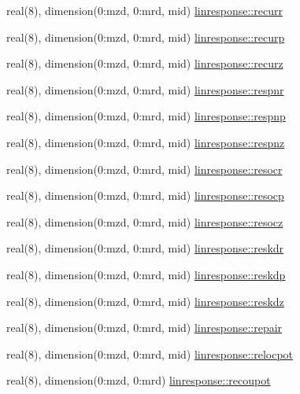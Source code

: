 \begin{DoxyCompactItemize}
\item 
real(8), dimension(0\+:mzd, 0\+:mrd, mid) \hyperlink{namespacelinresponse_a222c8a4189b33f0a3d3e5ecb65f9eb71}{linresponse\+::recurr}
\item 
real(8), dimension(0\+:mzd, 0\+:mrd, mid) \hyperlink{namespacelinresponse_ad8ba23f685d178f2b77689ff9ebcc4fd}{linresponse\+::recurp}
\item 
real(8), dimension(0\+:mzd, 0\+:mrd, mid) \hyperlink{namespacelinresponse_a8fa0a4d1352ead394965075f9ce9d71b}{linresponse\+::recurz}
\item 
real(8), dimension(0\+:mzd, 0\+:mrd, mid) \hyperlink{namespacelinresponse_a1bf3f31e13280679b10213f2bbf20a6d}{linresponse\+::respnr}
\item 
real(8), dimension(0\+:mzd, 0\+:mrd, mid) \hyperlink{namespacelinresponse_ac5eaeb720dd5f4c714f729f5c743a803}{linresponse\+::respnp}
\item 
real(8), dimension(0\+:mzd, 0\+:mrd, mid) \hyperlink{namespacelinresponse_a5521f9f4746cad113563a738f4ca93a5}{linresponse\+::respnz}
\item 
real(8), dimension(0\+:mzd, 0\+:mrd, mid) \hyperlink{namespacelinresponse_a2baf378e57c93ac0ab00325d1b8a929c}{linresponse\+::resocr}
\item 
real(8), dimension(0\+:mzd, 0\+:mrd, mid) \hyperlink{namespacelinresponse_ab2c43282a9f2e416ecf169cf33232c7a}{linresponse\+::resocp}
\item 
real(8), dimension(0\+:mzd, 0\+:mrd, mid) \hyperlink{namespacelinresponse_a0ea3b943fe3389af9c2ac58b6960d56a}{linresponse\+::resocz}
\item 
real(8), dimension(0\+:mzd, 0\+:mrd, mid) \hyperlink{namespacelinresponse_a873d3e41a72583e692b572b7bd9bd619}{linresponse\+::reskdr}
\item 
real(8), dimension(0\+:mzd, 0\+:mrd, mid) \hyperlink{namespacelinresponse_a74707cbfad2c3353821bbd8887ff2edf}{linresponse\+::reskdp}
\item 
real(8), dimension(0\+:mzd, 0\+:mrd, mid) \hyperlink{namespacelinresponse_a27a9fba4c442bf4cf7691243737a89e2}{linresponse\+::reskdz}
\item 
real(8), dimension(0\+:mzd, 0\+:mrd, mid) \hyperlink{namespacelinresponse_a84c63a614056a861745a1dbb504e9688}{linresponse\+::repair}
\item 
real(8), dimension(0\+:mzd, 0\+:mrd, mid) \hyperlink{namespacelinresponse_a6bb46d69aff571994a9f9fa1bd2c6e66}{linresponse\+::relocpot}
\item 
real(8), dimension(0\+:mzd, 0\+:mrd) \hyperlink{namespacelinresponse_a6e77c8092534f158dea0c7e2e24adcb4}{linresponse\+::recoupot}

\end{DoxyCompactItemize}
